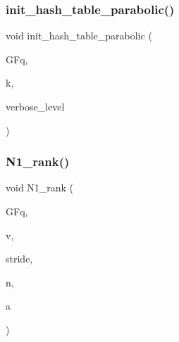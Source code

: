\mbox{\label{_l_i_b_2_g_a_l_o_i_s_2orthogonal__points_8_c_ac0501667678e59124c88842414489011}} 
\subsubsection{\texorpdfstring{init\+\_\+hash\+\_\+table\+\_\+parabolic()}{init\_hash\_table\_parabolic()}}
{\footnotesize\ttfamily void init\+\_\+hash\+\_\+table\+\_\+parabolic (\begin{DoxyParamCaption}\item[{\mbox{\hyperlink{classfinite__field}{finite\+\_\+field}} \&}]{G\+Fq,  }\item[{\mbox{\hyperlink{galois_8h_a09fddde158a3a20bd2dcadb609de11dc}{I\+NT}}}]{k,  }\item[{\mbox{\hyperlink{galois_8h_a09fddde158a3a20bd2dcadb609de11dc}{I\+NT}}}]{verbose\+\_\+level }\end{DoxyParamCaption})}

\mbox{\label{_l_i_b_2_g_a_l_o_i_s_2orthogonal__points_8_c_aeb5e4527dd73fce52439f30400b9946a}} 
\subsubsection{\texorpdfstring{N1\+\_\+rank()}{N1\_rank()}}
{\footnotesize\ttfamily void N1\+\_\+rank (\begin{DoxyParamCaption}\item[{\mbox{\hyperlink{classfinite__field}{finite\+\_\+field}} \&}]{G\+Fq,  }\item[{\mbox{\hyperlink{galois_8h_a09fddde158a3a20bd2dcadb609de11dc}{I\+NT}} $\ast$}]{v,  }\item[{\mbox{\hyperlink{galois_8h_a09fddde158a3a20bd2dcadb609de11dc}{I\+NT}}}]{stride,  }\item[{\mbox{\hyperlink{galois_8h_a09fddde158a3a20bd2dcadb609de11dc}{I\+NT}}}]{n,  }\item[{\mbox{\hyperlink{galois_8h_a09fddde158a3a20bd2dcadb609de11dc}{I\+NT}} \&}]{a }\end{DoxyParamCaption})}

